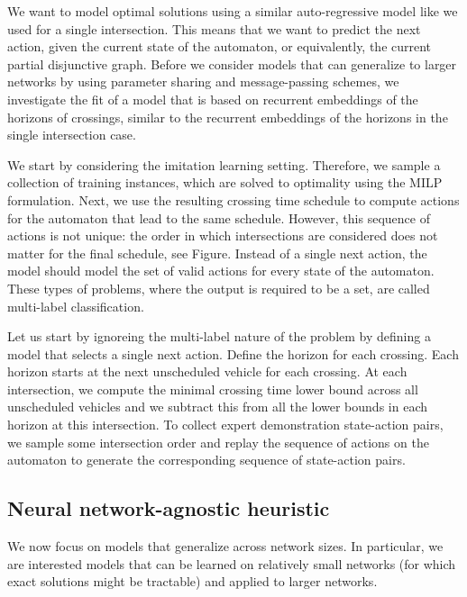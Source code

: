 \documentclass[a4paper]{article}
\theoremstyle{definition}
\theoremstyle{plain}
\begin{document}
We want to model optimal solutions using a similar auto-regressive model like we
used for a single intersection. This means that we want to predict the next
action, given the current state of the automaton, or equivalently, the current
partial disjunctive graph.
Before we consider models that can generalize to larger networks by using
parameter sharing and message-passing schemes, we investigate the fit of a model
that is based on recurrent embeddings of the horizons of crossings, similar to
the recurrent embeddings of the horizons in the single intersection case.

We start by considering the imitation learning setting. Therefore, we sample a
collection of training instances, which are solved to optimality using the MILP
formulation. Next, we use the resulting crossing time schedule to compute
actions for the automaton that lead to the same schedule.
However, this sequence of actions is not unique: the order in which
intersections are considered does not matter for the final schedule, see Figure.
Instead of a single next action, the model should model the set of valid actions
for every state of the automaton. These types of problems, where the output is
required to be a set, are called multi-label classification.

Let us start by ignoreing the multi-label nature of the problem by defining
a model that selects a single next action.
%
Define the horizon for each crossing. Each horizon starts at the next
unscheduled vehicle for each crossing. At each intersection, we compute the
minimal crossing time lower bound across all unscheduled vehicles and we
subtract this from all the lower bounds in each horizon at this intersection.
%
To collect expert demonstration state-action pairs, we sample some intersection
order and replay the sequence of actions on the automaton to generate the
corresponding sequence of state-action pairs.


\subsection{Neural network-agnostic heuristic}

We now focus on models that generalize across network sizes. In particular, we
are interested models that can be learned on relatively small networks (for
which exact solutions might be tractable) and applied to larger networks.
\end{document}
